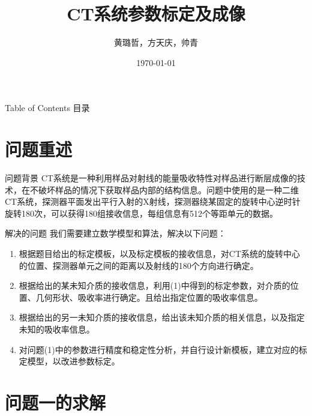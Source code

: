 \documentclass{beamer}
\begin{document}
 

  \title{CT系统参数标定及成像}
  \author{黄璐哲，方天庆，帅青}
  \date{\today}

  \begin{frame}[plain,t]
    \titlepage
  \end{frame} 
  
  \begin{frame}{Table of Contents 目录}
    \tableofcontents
  \end{frame} 
  
  \section{问题重述}
  \begin{frame}{问题背景}
    CT系统是一种利用样品对射线的能量吸收特性对样品进行断层成像的技术，在不破坏样品的情况下获取样品内部的结构信息。问题中使用的是一种二维CT系统，探测器平面发出平行入射的X射线，探测器绕某固定的旋转中心逆时针旋转180次，可以获得180组接收信息，每组信息有512个等距单元的数据。
  \end{frame} %

  \begin{frame}{解决的问题}
    我们需要建立数学模型和算法，解决以下问题：
    \begin{enumerate}
    
    \item 根据题目给出的标定模板，以及标定模板的接收信息，对CT系统的旋转中心的位置、探测器单元之间的距离以及射线的180个方向进行确定。
    
    \item 根据给出的某未知介质的接收信息，利用(1)中得到的标定参数，对介质的位置、几何形状、吸收率进行确定。且给出指定位置的吸收率信息。
    \item 根据给出的另一未知介质的接收信息，给出该未知介质的相关信息，以及指定未知的吸收率信息。
    \item 对问题(1)中的参数进行精度和稳定性分析，并自行设计新模板，建立对应的标定模型，以改进参数标定。
    \end{enumerate}
  \end{frame} %

  \section{问题一的求解}
  
\end{document}
